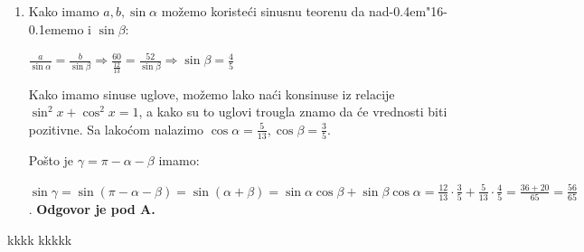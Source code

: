 \documentclass[a4paper,12pt]{report}
\def\dj{d\kern-0.4em\char"16\kern-0.1em}
\begin{document}
\begin{enumerate}[1.]
\item Kako imamo $a,b,\sin{\alpha} $ mo\v{z}emo koriste\'{c}i sinusnu teorenu da na\dj{}emo i $\sin{\beta}$:
\par $ \frac{a}{\sin{\alpha}}= \frac{b}{\sin{\beta}}  \Longrightarrow \frac{60}{\frac{12}{13}}= \frac{52}{\sin{\beta}} \Longrightarrow \sin{\beta} = \frac{4}{5} $
\par Kako imamo sinuse uglove, mo\v{z}emo lako na\'{c}i konsinuse iz relacije $\sin^2  x  +\cos^2  x  = 1$, a kako su to uglovi trougla znamo da \'{c}e vrednosti biti pozitivne. Sa lako\'{c}om nalazimo $\cos{\alpha} = \frac{5}{13}, \cos{\beta} = \frac{3}{5} $.
\par Po\v{s}to je $\gamma = \pi - \alpha - \beta$ imamo: 
\par $\sin{\gamma} = \sin(\pi - \alpha - \beta)= \sin( \alpha + \beta) = \sin{\alpha}\cos{\beta} + \sin{\beta} \cos{\alpha} = \frac{12}{13}\cdot \frac{3}{5} + \frac{5}{13}  \cdot \frac{4}{5} = \frac{36+20}{65} = \frac{56}{65} $. \textbf{Odgovor je pod A.}





\end{enumerate}





\begin{thebibliography}{9}
 kkkk
 kkkkk

\end{thebibliography}
\end{document}
